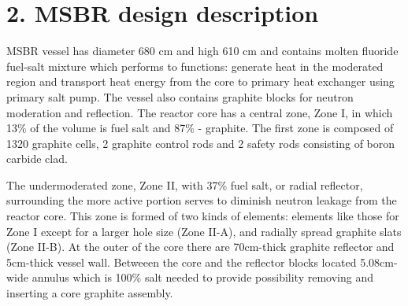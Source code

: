 \documentclass{anstrans}
\begin{document}
\section{2. MSBR design description}
MSBR vessel has diameter 680 cm and high 610 cm and contains molten fluoride fuel-salt mixture which performs to functions: generate heat in the moderated region and transport heat energy from the core to primary heat exchanger using primary salt pump. The vessel also contains graphite blocks for neutron moderation and reflection. The reactor core has a central zone, Zone I, in which 13\% of the volume is fuel salt and 87\% - graphite. The first zone is composed of 1320 graphite cells, 2 graphite control rods and 2 safety rods consisting of boron carbide clad. 

The undermoderated zone, Zone II, with 37\% fuel salt, or radial reflector, surrounding the more active portion serves to diminish neutron leakage from the reactor core. This zone is formed of two kinds of elements: elements like those for Zone I except for a larger hole size (Zone II-A), and radially spread graphite slats (Zone II-B). At the outer of the core there are 70cm-thick graphite reflector and 5cm-thick vessel wall. Betweeen the core and the reflector blocks located 5.08cm-wide annulus which is 100\% salt needed to provide possibility removing and inserting a core graphite assembly. 
\end{document}
